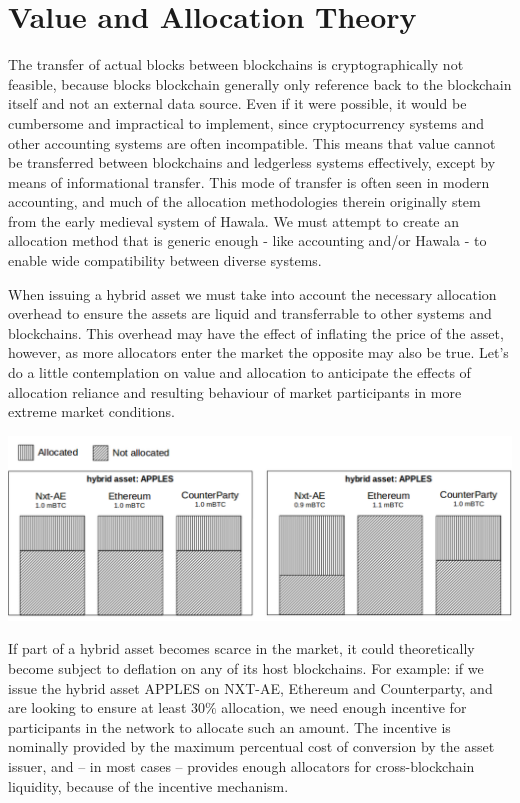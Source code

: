 \documentclass[11pt, a4paper]{article}
\begin{document}
\section{Value and Allocation Theory}

The transfer of actual blocks between blockchains is cryptographically not feasible, because blocks blockchain generally only reference back to the blockchain itself and not an external data source. Even if it were possible, it would be cumbersome and impractical to implement, since cryptocurrency systems and other accounting systems are often incompatible. This means that value cannot be transferred between blockchains and ledgerless systems effectively, except by means of informational transfer. This mode of transfer is often seen in modern accounting, and much of the allocation methodologies therein originally stem from the early medieval system of Hawala\cite{hawala}. We must attempt to create an allocation method that is generic enough - like accounting and/or Hawala - to enable wide compatibility between diverse systems.

When issuing a hybrid asset we must take into account the necessary allocation overhead to ensure the assets are liquid and transferrable to other systems and blockchains. This overhead may have the effect of inflating the price of the asset, however, as more allocators enter the market the opposite may also be true. Let's do a little contemplation on value and allocation to anticipate the effects of allocation reliance and resulting behaviour of market participants in more extreme market conditions.

\begin{center}
\includegraphics[width=.9\textwidth]{images/allocation.pdf}
\end{center}

If part of a hybrid asset becomes scarce in the market, it could theoretically become subject to deflation on any of its host blockchains. For example: if we issue the hybrid asset APPLES on NXT-AE, Ethereum and Counterparty, and are looking to ensure at least $30\%$ allocation, we need enough incentive for participants in the network to allocate such an amount. The incentive is nominally provided by the maximum percentual cost of conversion by the asset issuer, and -- in most cases -- provides enough allocators for cross-blockchain liquidity, because of the incentive mechanism.
\end{document}
